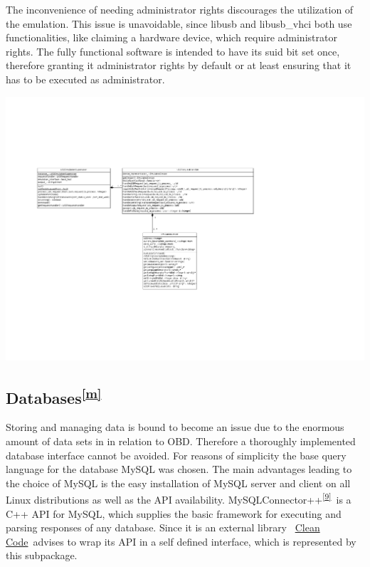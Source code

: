 {The inconvenience of needing administrator rights discourages the
utilization of the emulation. This issue is unavoidable, since libusb
and libusb\_vhci both use functionalities, like claiming a hardware
device, which require administrator rights. The fully functional
software is intended to have its suid bit set once, therefore granting
it administrator rights by default or at least ensuring that it has to
be executed as administrator.}

{\includegraphics{images/image04.png}}

\hypertarget{h.rpls244qrcic}{\subsection{\texorpdfstring{{Databases}\textsuperscript{\protect\hyperlink{cmnt13}{{[}m{]}}}}{Databases{[}m{]}}}\label{h.rpls244qrcic}}

{Storing and managing data is bound to become an issue due to the
enormous amount of data sets in in relation to OBD. Therefore a
thoroughly implemented database interface cannot be avoided. For reasons
of simplicity the base query language for the database MySQL was chosen.
The main advantages leading to the choice of MySQL is the easy
installation of MySQL server and client on all Linux distributions as
well as the API availability.
MySQLConnector++}\textsuperscript{\protect\hyperlink{ftnt9}{{[}9{]}}}{~is
a C++ API for MySQL, which supplies the basic framework for executing
and parsing responses of any database. Since it is an external library
~}{\protect\hyperlink{h.v0k64l3n1ort}{Clean Code}}{~advises }{to wrap
its API in a self defined interface, which is represented by this
subpackage. }

